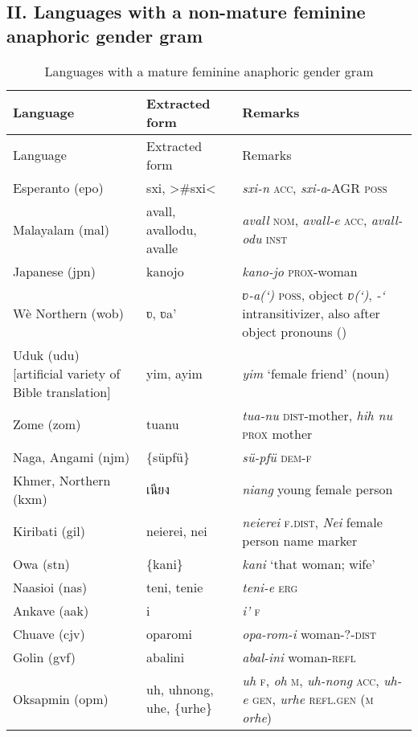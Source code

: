\subsection*{II. Languages with a non-mature feminine anaphoric gender gram \normalfont [59 languages]}

{\small\begin{longtable}{L{.25\textwidth}L{.25\textwidth}L{.5\textwidth}}
\caption{Languages with a mature feminine anaphoric gender gram}\\
\lsptoprule Language & Extracted form & Remarks\\\midrule\endfirsthead
\midrule    Language & Extracted form & Remarks\\\midrule\endhead
\endfoot\lspbottomrule\endlastfoot
Esperanto (epo)	&	sxi, >\#sxi<	&	\textit{sxi-n} \textsc{acc}, \textit{sxi-a}-AGR \textsc{poss}	\\
Malayalam (mal)	&	avall, avallodu, avalle	&	\textit{avall} \textsc{nom}, \textit{avall-e} \textsc{acc}, \textit{avall-odu} \textsc{inst}	\\
Japanese (jpn)	&	kanojo	&	\textit{kano-jo} \textsc{prox}-woman	\\
Wè Northern (wob)	&	ʋ, ʋa’	&	\textit{ʋ-a(‘)} \textsc{poss}, object \textit{ʋ(‘)}, \textit{-‘} intransitivizer, also after object pronouns (\citealt{Paradis1983})	\\
Uduk (udu) [artificial variety of Bible translation]	&	yim, ayim	&	\textit{yim} ‘female friend’ (noun)	\\
Zome (zom)	&	tuanu	&	\textit{tua-nu} \textsc{dist}-mother, \textit{hih nu} \textsc{prox} mother	\\
Naga, Angami (njm)	&	\{süpfü\}	&	\textit{sü-pfü} \textsc{dem-f}	\\
Khmer, Northern (kxm)	&	\textkhmer{เนียง}	&	\textit{niang} young female person 	\\
Kiribati (gil)	&	neierei, nei	&	\textit{neierei} \textsc{f.dist}, \textit{Nei} female person name marker	\\
Owa (stn)	&	\{kani\}	&	\textit{kani} ‘that woman; wife’	\\
Naasioi (nas)	&	teni, tenie	&	\textit{teni-e} \textsc{erg}	\\
Ankave (aak)	&	i\textquotesingle{}	&	\textit{i’} \textsc{f}	\\
Chuave (cjv)	&	oparomi	&	\textit{opa-rom-i} woman-?-\textsc{dist}	\\
Golin (gvf)	&	abalini	&	\textit{abal-ini} woman-\textsc{refl}	\\
Oksapmin (opm)	&	uh, uhnong, uhe, \{urhe\}	&	\textit{uh} \textsc{f}, \textit{oh} \textsc{m}, \textit{uh-nong} \textsc{acc}, \textit{uh-e} \textsc{gen}, \textit{urhe} \textsc{refl.gen} (\textsc{m} \textit{orhe})	\\

\end{longtable}}
